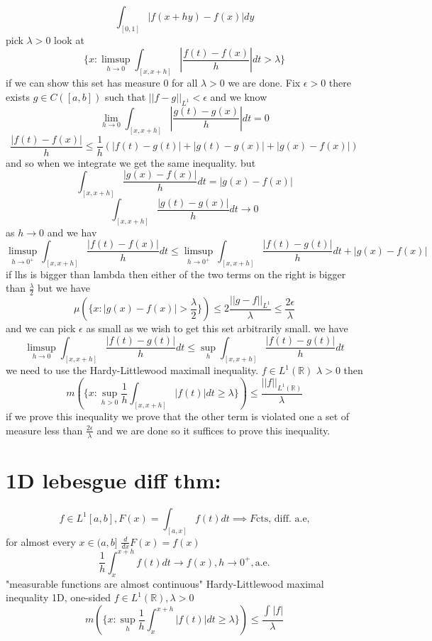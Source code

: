 \documentclass[11pt]{article}
\begin{document}
{    \[
        \int_{[0,1]}^{}|f(x+hy) - f(x)|dy
    \] 
    pick $\lambda > 0$ look at
    \[
        \{x : \limsup_{h\to 0} \int_{[x,x+h]}^{}|\frac{f(t)- f(x)}{h}| dt > \lambda\}
    \] 
    if we can show this set has measure 0 for all $\lambda > 0$ we are done. Fix $\epsilon > 0$
    there exists $g \in C([a,b])$ such that  $||f -g||_{L^{1}} < \epsilon$ and we know
    \[
        \lim_{h\to 0} \int_{[x,x+h]}^{}|\frac{g(t)-g(x)}{h}|dt = 0
    \]
   \[
       \frac{|f(t) - f(x)|}{h} \le \frac{1}{h}( |f(t) - g(t)|  + |g(t) - g(x)| +  |g(x) - f(x)|)
   \] 
   and so when we integrate we get the same inequality.
   but
   \[
       \int_{[x,x+h]}^{}\frac{|g(x)-f(x)|}{h}dt = |g(x) - f(x)|
   \] 
   \[
       \int_{[x,x+h]}^{}\frac{|g(t)-g(x)|}{h}dt \rightarrow 0 
   \] 
   as $h \rightarrow 0$ and we hav
   \[
       \limsup_{h\to 0^{+}}\int_{[x,x+h]}^{}\frac{|f(t)-f(x)|}{h}dt \le \limsup_{h\to 0^{+}} \int_{[x,x+h]}^{}\frac{|f(t)-g(t)|}{h}dt + |g(x) - f(x)|
   \] 
   if lhs is bigger than lambda then either of the two terms on the right is bigger than $\frac{\lambda}{2}$
   but we have
   \[
       \mu(\{x : |g(x) - f(x)| > \frac{\lambda}{2}\}) \le 2\frac{||g-f||_{L^{1}}}{\lambda} \le \frac{2\epsilon}{\lambda}
   \] 
   and we can pick $\epsilon$ as small as we wish to get this set arbitrarily small.
   we have
   \[
       \limsup_{h\to 0 } \int_{[x,x+h]}^{}\frac{|f(t)-g(t)|}{h}dt \le \sup_{h} \int_{[x,x+h]}^{}\frac{|f(t)-g(t)|}{h}dt
   \] 
   we need to use the Hardy-Littlewood maximall inequality. $f \in L^{1}( \mathbb{R})$ $\lambda > 0$ then
   \[
       m(\{x : \sup_{h > 0} \frac{1}{h} \int_{[x,x+h]}^{}|f(t)| dt \ge \lambda\}) \le \frac{||f||_{L^{1}( \mathbb{R})}}{\lambda}
   \] 
   if we prove this inequality we prove that the other term is violated one a set of measure less than $\frac{2\epsilon}{\lambda}$ and we are done so it suffices to prove this inequality.
}

\section{1D lebesgue diff thm:}

\[
    f \in L^{1}[a,b], F(x) = \int_{[a,x]}^{}f(t)dt \implies F \text{cts, diff. a.e,}
\] 
for almost every $x \in (a,b]$  $\frac{d}{dx}F(x) = f(x)$
\[
    \frac{1}{h}\int_{x}^{x+h}f(t)dt \rightarrow f(x), h \rightarrow 0^{+}, \text{a.e.}
\] 
"measurable functions are almost continuous"
Hardy-Littlewood maximal inequality 1D, one-sided $f \in L^{1}( \mathbb{R}), \lambda > 0$
\[
    m(\{x : \sup_h \frac{1}{h}\int_{x}^{x+h}|f(t)|dt \ge \lambda \}) \le \frac{\int_{}^{}|f|}{\lambda}
\] 
\end{document}
